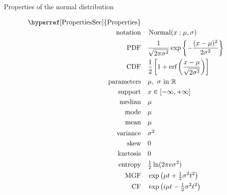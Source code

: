 

\begin{table*}[t!]
\caption[Normal distribution -- Properties]{Properties of the normal distribution}

\begin{align*}
\text{\hyperref[PropertiesSec]{Properties}}  \quad& \\
\text{notation} \quad & \op{Normal}(x\given \mu,\sigma)	\checked
\\
\text{PDF}\quad &   \frac{1}{\sqrt{2 \pi \sigma^2}}  \exp\left\{ - \frac{( x-\mu)^2}{2\sigma^2} \right\} \checked
\\
\text{CDF} \quad  &   \frac{1}{2}\left[  1 + \text{erf}\left(\frac{x-\mu}{\sqrt{2 \sigma^2}} \right) \right]	\checked
\\
\text{parameters}\quad &   \mu,\ \sigma \text{ in } \mathbb{R}						\checked
\\
\text{support} \quad &   x \in [-\infty, + \infty]									\checked
\\
\text{median} \quad  &  \mu												\checked
\\
\text{mode} \quad  & \mu													\checked
\\
\text{mean} \quad  &  \mu													\checked
\\
\text{variance} \quad  & \sigma^2											\checked
\\
\text{skew} \quad  &  0													\checked
\\
\text{kurtosis} \quad  &  0													\checked
\\	
\text{entropy} \quad  & \tfrac{1}{2} \ln(2\pi e \sigma^2)							\checked
\\
\text{MGF} \quad  &  \exp\left({\mu t + \tfrac{1}{2} \sigma^2 t^2 }\right)				\checked
\\
\text{CF} \quad  &  \exp\left({i \mu t - \tfrac{1}{2} \sigma^2 t^2}\right)					\checked
\end{align*}

\end{table*}

